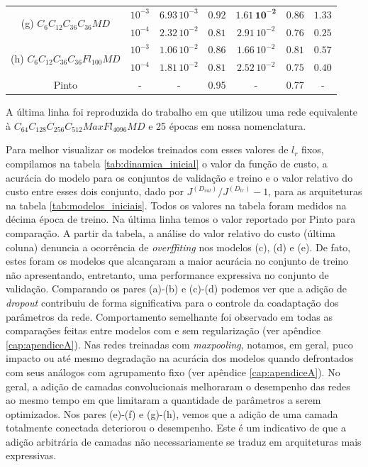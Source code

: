 \begin{table}[ht]
\begin{center}
\begin{tabular}{ |c|c|c|c|c|c|c| }
			\hline\hline
			\multirow{2}{*}{(g) $C_6C_{12}C_{36}C_{36}MD$}
			& $10^{-3}$ & $6.93\,10^{-3}$ & $0.92$ & $\mathbf{1.61\,10^{-2}}$ & $\mathbf{0.86}$ & $1.33$ \\ \cline{2-7}
			& $10^{-4}$ & $2.32\,10^{-2}$ & $0.81$ & $2.91\,10^{-2}$ & $0.76$ & $\mathbf{0.25}$ \\ \cline{2-7}
			
			\hline\hline
			\multirow{2}{*}{(h) $C_6C_{12}C_{36}C_{36}Fl_{100}MD$}
			& $10^{-3}$ & $1.06\,10^{-2}$ & $0.86$ & $1.66\,10^{-2}$ & $0.81$ & $0.57$ \\ \cline{2-7}
			& $10^{-4}$ & $1.81\,10^{-2}$ & $0.81$ & $2.52\,10^{-2}$ & $0.75$ & $0.40$ \\ \cline{2-7}
			\hline\hline
			Pinto\cite{otaro} & - & - & 0.95 & - & 0.77 &  - \\ \cline{2-7} \hline
		\end{tabular}\hfill%
	\end{center}
	\small A última linha foi reproduzida do trabalho em \cite{otaro} que utilizou uma rede equivalente à $C_{64}C_{128}C_{256}C_{512}MaxFl_{4096}MD$ e 25 épocas em nossa nomenclatura.
\end{table}

Para melhor visualizar os modelos treinados com esses valores de $l_r$ fixos, compilamos na tabela \ref{tab:dinamica_inicial} o valor da função de custo, a acurácia do modelo para os conjuntos de validação e treino e o valor relativo do custo entre esses dois conjunto, dado por $J^{(D_{val})}/J^{(D_{tr})} - 1$, para as arquiteturas na tabela \ref{tab:modelos_iniciais}. Todos os valores na tabela foram medidos na décima época de treino. Na última linha temos o valor reportado por Pinto para comparação. A partir da tabela, a análise do valor relativo do custo (última coluna) denuncia a ocorrência de \textit{overffiting} nos modelos (c), (d) e (e). De fato, estes foram os modelos que alcançaram a maior acurácia no conjunto de treino não apresentando, entretanto, uma performance expressiva no conjunto de validação. Comparando os pares (a)-(b) e (c)-(d) podemos ver que a adição de \textit{dropout} contribuiu de forma significativa para o controle da coadaptação dos parâmetros da rede. Comportamento semelhante foi observado em todas as comparações feitas entre modelos com e sem regularização (ver apêndice \ref{cap:apendiceA}). Nas redes treinadas com \textit{maxpooling}, notamos, em geral, puco impacto ou até mesmo degradação na acurácia dos modelos quando defrontados com seus análogos com agrupamento fixo (ver apêndice \ref{cap:apendiceA}). No geral, a adição de camadas convolucionais melhoraram o desempenho das redes ao mesmo tempo em que limitaram a quantidade de parâmetros a serem optimizados. Nos pares (e)-(f) e (g)-(h), vemos que a adição de uma camada totalmente conectada deteriorou o desempenho. Este é um indicativo de que a adição arbitrária de camadas não necessariamente se traduz em arquiteturas mais expressivas.

